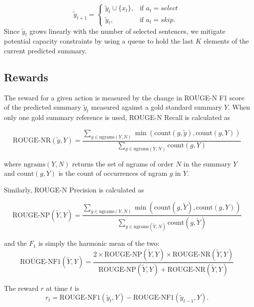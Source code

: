 \documentclass[12pt]{article}
\begin{document}
\begin{equation}
	\tilde{y}_{t + 1} =
	\begin{cases}
		\tilde{y}_{t} \cup \{ x_t \},	& \text{if } a_t = select  \\
		\tilde{y}_{t}, 			& \text{if } a_t = skip.
	\end{cases}
\end{equation}
Since $\tilde{y}_t$ grows linearly with the number of selected sentences, we mitigate potential capacity constraints by using a queue to hold the last $K$ elements of the current predicted summary. 

\subsection{Rewards} 
The reward for a given action is measured by the change in ROUGE-N F1 score of the predicted summary $\tilde{y}_{t}$ measured against a gold standard summary $Y$. When only one gold summary reference is used, ROUGE-N Recall is calculated as 

\begin{equation}
 \textrm{ROUGE-NR}(\tilde{y}, Y) = 
    \frac{\sum_{g \in \textrm{ngrams}(Y,N)} 
    \min \left(\textrm{count}(g, \tilde{y}), \textrm{count}(g, Y)\right)}{
    \sum_{g \in \textrm{ngrams}(Y,N)} 
    \textrm{count}(g, Y)
    }
\end{equation}

where $\textrm{ngrams}(Y, N)$ returns the set of ngrams of order $N$ in the summary $Y$ and $\textrm{count}(g, Y)$ is the count of occurrences of ngram $g$ in $Y.$

Similarly, ROUGE-N Precision is calculated as 

\begin{equation}
\textrm{ROUGE-NP}(\tilde{Y}, Y) = 
    \frac{\sum_{g \in \textrm{ngrams}(Y,N)} 
    \min \left(\textrm{count}(g, \tilde{Y}), \textrm{count}(g, Y)\right)}{
        \sum_{g \in \textrm{ngrams}(\tilde{Y},N)} 
        \textrm{count}(g, \tilde{Y})
    }
\end{equation}

and the $F_1$ is simply the harmonic mean of the two:
\begin{equation}
\textrm{ROUGE-NF1}(\tilde{Y}, Y) = \frac{ 2 \times 
\textrm{ROUGE-NP}(\tilde{Y}, Y) \times \textrm{ROUGE-NR}(\tilde{Y}, Y)
}{ \textrm{ROUGE-NP}(\tilde{Y}, Y) + \textrm{ROUGE-NR}(\tilde{Y}, Y) }
\end{equation}

The reward $r$ at time $t$ is 
\begin{equation}
r_t = \textrm{ROUGE-NF1}(\tilde{y}_{t}, Y) -  \textrm{ROUGE-NF1}(\tilde{y}_{t-1}, Y).
\end{equation}
\end{document}

